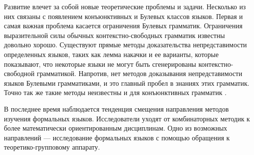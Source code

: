 \documentclass[14pt]{matmex-diploma-custom}
\begin{document}
Развитие влечет за собой новые теоретические проблемы и задачи. Несколько из них
связаны с появлением конъюнктивных и Булевых классов языков.
Первая и самая важная проблема касается
ограничения Булевых грамматик. Ограничения выразительной силы обычных контекстно-свободных грамматик
известны довольно хорошо. Существуют прямые методы доказательства непредставимости
определенных языков, таких как лемма накачки и ее
варианты, которые показывают, что некоторые языки не могут быть сгенерированы
 контекстно-свободной грамматикой. Напротив, нет методов доказывания
непредставимости языков Булевыми грамматиками, и это главный пробел в
знаниях этих грамматик. Точно так же такие методы неизвестны
и для конъюнктивных грамматик \cite{OKHOTIN201327}.

В последнее время наблюдается тенденция смещения направления методов изучения формальных языков. 
Исследователи уходят от комбинаторных методик к более математически ориентированным дисциплинам.
Одно из возможных направлений --- исследование формальных языков с помощью обращения 
к теоретико-групповому аппарату.
\end{document}
